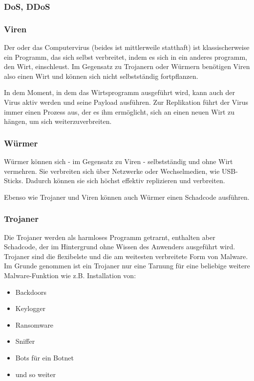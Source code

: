 \subsubsection{DoS, DDoS}
\label{sec:DoSDDoS}

\subsubsection{Viren}
\label{sec:Viren}

Der oder das Computervirus (beides ist mittlerweile statthaft) ist klassischerweise ein Programm, das sich selbst verbreitet, indem es sich in ein anderes programm, den Wirt, einschleust. Im Gegensatz zu Trojanern oder Würmern benötigen Viren also einen Wirt und können sich nicht selbstständig fortpflanzen.

In dem Moment, in dem das Wirtsprogramm ausgeführt wird, kann auch der Virus aktiv werden und seine Payload ausführen. Zur Replikation führt der Virus immer einen Prozess aus, der es ihm ermöglicht, sich an einen neuen Wirt zu hängen, um sich weiterzuverbreiten.

\subsubsection{Würmer}
\label{sec:Wuermer}

Würmer können sich - im Gegensatz zu Viren - selbstständig und ohne Wirt vermehren. Sie verbreiten sich über Netzwerke oder Wechselmedien, wie USB-Sticks. Dadurch können sie sich höchst effektiv replizieren und verbreiten.

Ebenso wie Trojaner und Viren können auch Würmer einen Schadcode ausführen.

\subsubsection{Trojaner}
\label{sec:Trojaner}

Die Trojaner werden als harmloses Programm getrarnt, enthalten aber Schadcode, der im Hintergrund ohne Wissen des Anwenders ausgeführt wird. Trojaner sind die flexibelste und die am weitesten verbreitete Form von Malware. Im Grunde genommen ist ein Trojaner nur eine Tarnung für eine beliebige weitere Malware-Funktion wie z.B. Installation von:

\begin{multicols}{2}
	\begin{itemize}
		\item Backdoors
		\item Keylogger
		\item Ransomware
		\item Sniffer
		\item Bots für ein Botnet
		\item und so weiter
	\end{itemize}
\end{multicols}

